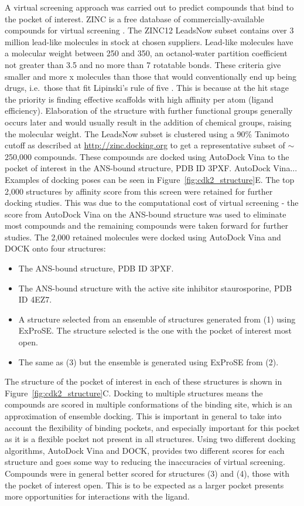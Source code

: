 A virtual screening approach was carried out to predict compounds that bind to the pocket of interest.
ZINC is a free database of commercially-available compounds for virtual screening \cite{Sterling2015}.
The ZINC12 LeadsNow subset contains over 3 million lead-like molecules in stock at chosen suppliers.
Lead-like molecules have a molecular weight between 250 and 350, an octanol-water partition coefficient not greater than 3.5 and no more than 7 rotatable bonds.
These criteria give smaller and more x molecules than those that would conventionally end up being drugs, i.e.\ those that fit Lipinski's rule of five \cite{}.
This is because at the hit stage the priority is finding effective scaffolds with high affinity per atom (ligand efficiency).
Elaboration of the structure with further functional groups generally occurs later and would usually result in the addition of chemical groups, raising the molecular weight.
The LeadsNow subset is clustered using a 90\% Tanimoto cutoff as described at \url{http://zinc.docking.org} to get a representative subset of $\sim$250,000 compounds.
These compounds are docked using AutoDock Vina \cite{Trott2010} to the pocket of interest in the ANS-bound structure, PDB ID 3PXF.
AutoDock Vina...
Examples of docking poses can be seen in Figure~\ref{fig:cdk2_structure}E.
The top 2,000 structures by affinity score from this screen were retained for further docking studies.
This was due to the computational cost of virtual screening - the score from AutoDock Vina on the ANS-bound structure was used to eliminate most compounds and the remaining compounds were taken forward for further studies.
The 2,000 retained molecules were docked using AutoDock Vina and DOCK \cite{Allen2015} onto four structures:
\begin{itemize}
\item The ANS-bound structure, PDB ID 3PXF.
\item The ANS-bound structure with the active site inhibitor staurosporine, PDB ID 4EZ7.
\item A structure selected from an ensemble of structures generated from (1) using ExProSE.
The structure selected is the one with the pocket of interest most open.
\item The same as (3) but the ensemble is generated using ExProSE from (2).
\end{itemize}
The structure of the pocket of interest in each of these structures is shown in Figure~\ref{fig:cdk2_structure}C.
Docking to multiple structures means the compounds are scored in multiple conformations of the binding site, which is an approximation of ensemble docking.
This is important in general to take into account the flexibility of binding pockets, and especially important for this pocket as it is a flexible pocket not present in all structures.
Using two different docking algorithms, AutoDock Vina and DOCK, provides two different scores for each structure and goes some way to reducing the inaccuracies of virtual screening.
Compounds were in general better scored for structures (3) and (4), those with the pocket of interest open.
This is to be expected as a larger pocket presents more opportunities for interactions with the ligand.


